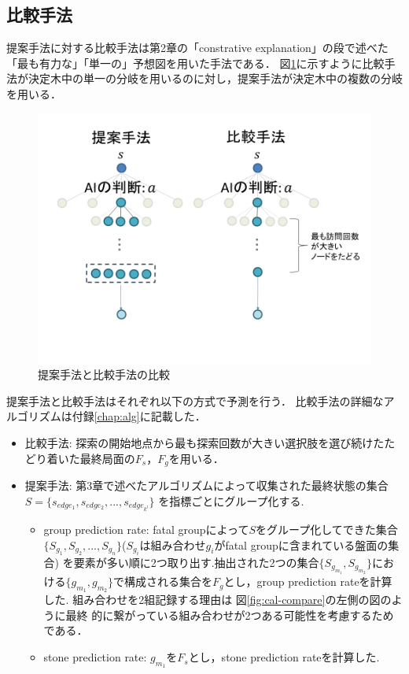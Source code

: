 \subsection{比較手法}
提案手法に対する比較手法は第2章の「constrative explanation」の段で述べた「最も有力な」「単一の」予想図を用いた手法である．
図\ref{fig:compare}に示すように比較手法が決定木中の単一の分岐を用いるのに対し，提案手法が決定木中の複数の分岐を用いる．
\begin{figure}[htbp]
	\centering
	\includegraphics[width=\linewidth]{./figure/compare-image.png}
	\caption{提案手法と比較手法の比較}
	\label{fig:compare}
\end{figure}
提案手法と比較手法はそれぞれ以下の方式で予測を行う．
比較手法の詳細なアルゴリズムは付録\ref{chap:alg}に記載した．
\newpage
\begin{itemize}
	\item 比較手法: 探索の開始地点から最も探索回数が大きい選択肢を選び続けたたどり着いた最終局面の$F_s， F_g$を用いる．
	\item 提案手法: 第3章で述べたアルゴリズムによって収集された最終状態の集合$S=\{s_{edge_1}, s_{edge_2}, ..., s_{edge_{k^l}}\}$
	    を指標ごとにグループ化する.
		\begin{itemize}
			\item group prediction rate: fatal groupによって$S$をグループ化してできた集合$\{S_{g_1}, S_{g_2}, ..., S_{g_n}\}$($S_{g_i}$は組み合わせ$g_i$がfatal groupに含まれている盤面の集合)
			を要素が多い順に2つ取り出す.抽出された2つの集合$\{S_{g_{m_1}}, S_{g_{m_2}}\}$における$\{g_{m_1}, g_{m_2}\}$で構成される集合を$F_g$とし，group prediction rateを計算した. 組み合わせを2組記録する理由は
            図\ref{fig:cal-compare}の左側の図のように最終
            的に繋がっている組み合わせが2つある可能性を考慮するためである．
            
			\item stone prediction rate: $g_{m_1}$を$F_s$とし，stone prediction rateを計算した.
		\end{itemize}
\end{itemize}

